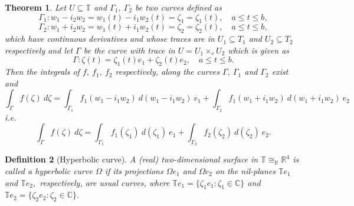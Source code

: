 \documentclass[a4paper,12pt]{article}
\newtheorem{theorem}{Theorem}[section]
\newtheorem{definition}[theorem]{Definition}
\theoremstyle{remark}
\begin{document}
\begin{theorem}\label{th:int price}
	Let $U\subseteq \mathbb{T}$
	and $\Gamma_1,~\Gamma_2$ be two curves defined as 
	\begin{equation}
	\Gamma_1:w_1-i_2w_2=w_1(t)-i_1w_2(t)=\zeta_1=\zeta_1(t),\quad a\le t\le b,
	\end{equation}	
	\begin{equation}
	\Gamma_2:w_1+i_2w_2=w_1(t)+i_1w_2(t)=\zeta_2=\zeta_2(t),\quad a\le t\le b,
	\end{equation}		
	which have continuous derivatives and whose traces are in $U_1\subseteq T_1$ and $U_2\subseteq T_2$ respectively and let $\Gamma$ be the curve with trace in $U=	U_1\times_e U_2$ which is given as 
	\begin{equation}
	\Gamma:\zeta(t)=\zeta_1(t)e_1+\zeta_2(t)e_2,\quad a\le t\le b.
	\end{equation}	
	Then the integrals of $f,~f_1,~f_2$ respectively, along the curves $\Gamma,~\Gamma_1$ and $\Gamma_2$ exist and 
	\begin{equation}
	\int_{\Gamma}f(\zeta)~d\zeta=\int_{\Gamma_1}f_1(w_1-i_1w_2)~d(w_1-i_1w_2)~e_1+\int_{\Gamma_2}f_1(w_1+i_1w_2)~d(w_1+i_1w_2)~e_2
	\end{equation}
	i.e.
	\begin{equation}
	\int_{\Gamma}f(\zeta)~d\zeta=\int_{\Gamma_1}f_1(\zeta_1)~d(\zeta_1)~e_1+\int_{\Gamma_2}f_2(\zeta_2)~d(\zeta_2)~e_2.
	\end{equation}	
\end{theorem}

\begin{definition}[Hyperbolic curve]
A (real) two-dimensional surface in $\mathbb{T}\cong_{\mathbb{R}}\mathbb{R}^4$ is called a \cite{meluna2021} hyperbolic curve $\Omega$  if its projections $\Omega e_1$ and $\Omega e_2$ on the nil-planes $\mathbb{T}{e_1}$ and $\mathbb{T}e_2,$ respectively, are usual curves, where 
$\mathbb{T}e_1=\{\zeta_1e_1:\zeta_1\in\mathbb{C}\}$ and $\mathbb{T}e_2=\{\zeta_2e_2:\zeta_2\in\mathbb{C}\}.$
\end{definition}
\end{document}
